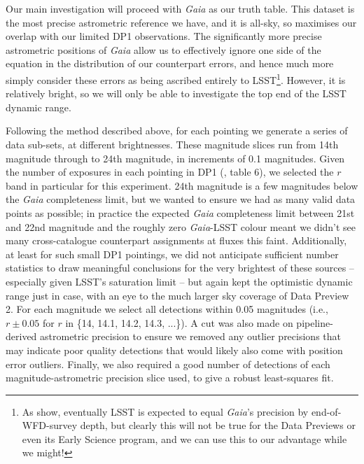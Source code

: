 \documentclass[SE,lsstdraft,authoryear,toc]{lsstdoc}
\begin{document}
Our main investigation will proceed with \textit{Gaia} as our truth table.
This dataset is the most precise astrometric reference we have, and it is all-sky, so maximises our overlap with our limited DP1 observations.
The significantly more precise astrometric positions of \textit{Gaia} allow us to effectively ignore one side of the equation in the distribution of our counterpart errors, and hence much more simply consider these errors as being ascribed entirely to LSST\footnote{As \citet{Ivezic2014} show, eventually LSST is expected to equal \textit{Gaia}'s precision by end-of-WFD-survey depth, but clearly this will not be true for the Data Previews or even its Early Science program, and we can use this to our advantage while we might!}.
However, it is relatively bright, so we will only be able to investigate the top end of the LSST dynamic range.

Following the method described above, for each pointing we generate a series of data sub-sets, at different brightnesses.
These magnitude slices run from 14th magnitude through to 24th magnitude, in increments of 0.1 magnitudes.
Given the number of exposures in each pointing in DP1 (\citealp{Guy2025}, table 6), we selected the $r$ band in particular for this experiment.
24th magnitude is a few magnitudes below the \textit{Gaia} completeness limit, but we wanted to ensure we had as many valid data points as possible; in practice the expected \textit{Gaia} completeness limit between 21st and 22nd magnitude and the roughly zero \textit{Gaia}-LSST colour meant we didn't see many cross-catalogue counterpart assignments at fluxes this faint.
Additionally, at least for such small DP1 pointings, we did not anticipate sufficient number statistics to draw meaningful conclusions for the very brightest of these sources -- especially given LSST's saturation limit -- but again kept the optimistic dynamic range just in case, with an eye to the much larger sky coverage of Data Preview 2.
For each magnitude we select all detections within 0.05 magnitudes (i.e., $r\pm0.05$ for $r$ in \{14, 14.1, 14.2, 14.3, ...\}).
A cut was also made on pipeline-derived astrometric precision to ensure we removed any outlier precisions that may indicate poor quality detections that would likely also come with position error outliers.
Finally, we also required a good number of detections of each magnitude-astrometric precision slice used, to give a robust least-squares fit.
\end{document}
